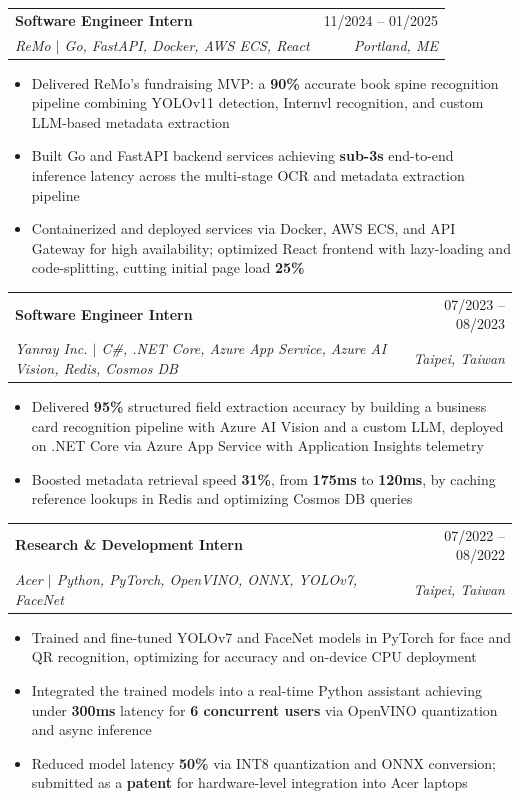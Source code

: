 \documentclass[letterpaper,11pt]{article}
\makeatletter
\newcommand{\resumeItem}[1]{
  \item\small{
    {#1 \vspace{-2pt}}
  }
}
\newcommand{\resumeSubheading}[4]{
  \vspace{-2pt}\item
    \begin{tabular*}{0.97\textwidth}[t]{l@{\extracolsep{\fill}}r}
      \textbf{#1} & #2 \\
      \textit{\small#3} & \textit{\small #4} \\
    \end{tabular*}\vspace{-7pt}
}
\newcommand{\resumeItemListStart}{\begin{itemize}}
\newcommand{\resumeItemListEnd}{\end{itemize}\vspace{-5pt}}
\makeatother
\begin{document}
    \resumeSubheading
      {Software Engineer Intern}{11/2024 -- 01/2025}
      {ReMo $|$ Go, FastAPI, Docker, AWS ECS, React}{Portland, ME}
      \resumeItemListStart
        \resumeItem{Delivered ReMo's fundraising MVP: a \textbf{90\%} accurate book spine recognition pipeline combining YOLOv11 detection, Internvl recognition, and custom LLM-based metadata extraction}
        \resumeItem{Built Go and FastAPI backend services achieving \textbf{sub-3s} end-to-end inference latency across the multi-stage OCR and metadata extraction pipeline}
        \resumeItem{Containerized and deployed services via Docker, AWS ECS, and API Gateway for high availability; optimized React frontend with lazy-loading and code-splitting, cutting initial page load \textbf{25\%}}
      \resumeItemListEnd

    \resumeSubheading
      {Software Engineer Intern}{07/2023 -- 08/2023}
      {Yanray Inc. $|$ C\#, .NET Core, Azure App Service, Azure AI Vision, Redis, Cosmos DB}{Taipei, Taiwan}
      \resumeItemListStart
        \resumeItem{Delivered \textbf{95\%} structured field extraction accuracy by building a business card recognition pipeline with Azure AI Vision and a custom LLM, deployed on .NET Core via Azure App Service with Application Insights telemetry}
        \resumeItem{Boosted metadata retrieval speed \textbf{31\%}, from \textbf{175ms} to \textbf{120ms}, by caching reference lookups in Redis and optimizing Cosmos DB queries}
      \resumeItemListEnd

    \resumeSubheading
      {Research \& Development Intern}{07/2022 -- 08/2022}
      {Acer $|$ Python, PyTorch, OpenVINO, ONNX, YOLOv7, FaceNet}{Taipei, Taiwan}
      \resumeItemListStart
        \resumeItem{Trained and fine-tuned YOLOv7 and FaceNet models in PyTorch for face and QR recognition, optimizing for accuracy and on-device CPU deployment}
        \resumeItem{Integrated the trained models into a real-time Python assistant achieving under \textbf{300ms} latency for \textbf{6 concurrent users} via OpenVINO quantization and async inference}
        \resumeItem{Reduced model latency \textbf{50\%} via INT8 quantization and ONNX conversion; submitted as a \textbf{patent} for hardware-level integration into Acer laptops}
      \resumeItemListEnd
\end{document}
